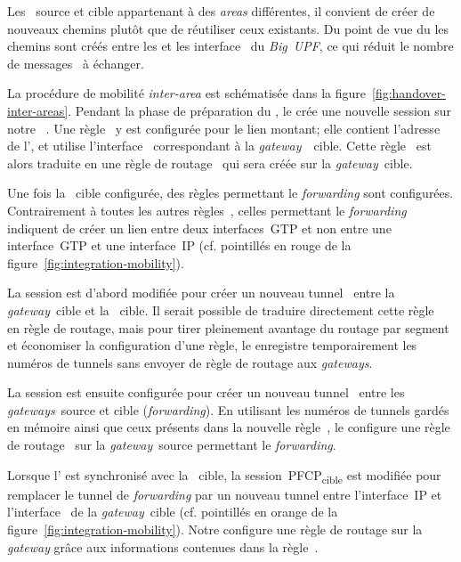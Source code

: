 \documentclass[../main.tex]{subfiles}
\begin{document}
Les ~source et cible appartenant à des \textit{areas} différentes, il convient de créer de nouveaux chemins plutôt que de réutiliser ceux existants.
Du point de vue du  les chemins sont créés entre les  et les interface~ du \textit{Big~UPF}, ce qui réduit le nombre de messages~ à échanger.

La procédure de mobilité \textit{inter-area} est schématisée dans la figure~\ref{fig:handover-inter-areas}.
Pendant la phase de préparation du , le  crée une nouvelle session  sur notre ~.
Une règle~ y est configurée pour le lien montant; elle contient l’adresse de l’, et utilise l’interface~ correspondant à la \textit{gateway}~~cible.
Cette règle~ est alors traduite en une règle de routage~ qui sera créée sur la \textit{gateway}~cible.

Une fois la ~cible configurée, des règles permettant le \textit{forwarding} sont configurées.
Contrairement à toutes les autres règles~, celles permettant le \textit{forwarding} indiquent de créer un lien entre deux interfaces~GTP et non entre une interface~GTP et une interface~IP (cf. pointillés en rouge de la figure~\ref{fig:integration-mobility}).

La session  est d’abord modifiée pour créer un nouveau tunnel~ entre la \textit{gateway}~cible et la ~cible.
Il serait possible de traduire directement cette règle~ en règle de routage, mais pour tirer pleinement avantage du routage par segment et économiser la configuration d’une règle, le  enregistre temporairement les numéros de tunnels sans envoyer de règle de routage aux \textit{gateways}.

La session  est ensuite configurée pour créer un nouveau tunnel~ entre les \textit{gateways}~source et cible (\textit{forwarding}).
En utilisant les numéros de tunnels gardés en mémoire ainsi que ceux présents dans la nouvelle règle~, le  configure une règle de routage~ sur la \textit{gateway}~source permettant le \textit{forwarding}.

Lorsque l’ est synchronisé avec la ~cible, la session~PFCP\textsubscript{cible} est modifiée pour remplacer le tunnel de \textit{forwarding} par un nouveau tunnel entre l’interface~IP et l’interface~ de la \textit{gateway}~cible (cf. pointillés en orange de la figure~\ref{fig:integration-mobility}).
Notre  configure une règle de routage sur la \textit{gateway} grâce aux informations contenues dans la règle~.
\end{document}
